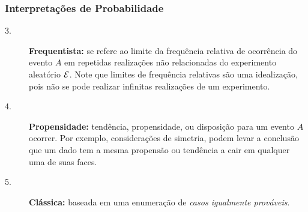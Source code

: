 \begin{frame}
\frametitle{\textbf{Interpretações de Probabilidade}}
\baselineskip=13pt
\begin{block}{}

\begin{description}
\item[3.] {\bf Frequentista:} se refere ao limite da frequência
relativa de ocorrência do evento $A$ em repetidas realizações não
relacionadas do experimento aleatório ${\cal E}$. Note que limites de
frequência relativas são uma idealização, pois não se pode realizar
infinitas realizações de um experimento.

\item[4.] {\bf Propensidade:} tendência, propensidade, ou disposição
para um evento $A$ ocorrer. Por exemplo, considerações de simetria, podem levar a conclusão que um dado tem a mesma propensão ou tendência a cair em qualquer uma de suas faces.

\item[5.] {\bf Clássica:} baseada em uma enumeração de {\em casos
igualmente prováveis}.
\end{description}

\end{block}
\end{frame}
%
